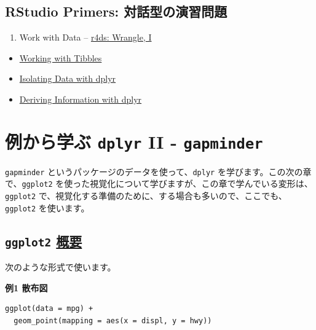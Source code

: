 \documentclass[
  xelatex, ja=standard]{bxjsbook}
\providecommand{\tightlist}{%
  \setlength{\itemsep}{0pt}\setlength{\parskip}{0pt}}
\theoremstyle{definition}
\theoremstyle{definition}
\theoremstyle{definition}
\theoremstyle{definition}
\theoremstyle{remark}
\begin{document}
\hypertarget{rstudio-primers-ux5bfeux8a71ux578bux306eux6f14ux7fd2ux554fux984c}{%
\subsection{RStudio Primers: 対話型の演習問題}\label{rstudio-primers-ux5bfeux8a71ux578bux306eux6f14ux7fd2ux554fux984c}}

\begin{enumerate}
\def\labelenumi{\arabic{enumi}.}
\setcounter{enumi}{1}
\tightlist
\item
  Work with Data -- \href{https://r4ds.had.co.nz/wrangle-intro.html\#wrangle-intro}{r4ds: Wrangle, I}
\end{enumerate}

\begin{itemize}
\tightlist
\item
  \href{https://rstudio.cloud/learn/primers/2.1}{Working with Tibbles}
\item
  \href{https://rstudio.cloud/learn/primers/2.2}{Isolating Data with dplyr}
\item
  \href{https://rstudio.cloud/learn/primers/2.3}{Deriving Information with dplyr}
\end{itemize}

\hypertarget{ux4f8bux304bux3089ux5b66ux3076-dplyr-ii---gapminder}{%
\section{\texorpdfstring{例から学ぶ \texttt{dplyr} II - \texttt{gapminder}}{例から学ぶ dplyr II - gapminder}}\label{ux4f8bux304bux3089ux5b66ux3076-dplyr-ii---gapminder}}

\texttt{gapminder} というパッケージのデータを使って、\texttt{dplyr} を学びます。この次の章で、\texttt{ggplot2} を使った視覚化について学びますが、この章で学んでいる変形は、\texttt{ggplot2} で、視覚化する準備のために、する場合も多いので、ここでも、\texttt{ggplot2} を使います。

\hypertarget{ggplot2-ux6982ux8981}{%
\subsection{\texorpdfstring{\texttt{ggplot2} \href{https://ggplot2.tidyverse.org}{概要}}{ggplot2 概要}}\label{ggplot2-ux6982ux8981}}

次のような形式で使います。

\textbf{例1 散布図}

\begin{verbatim}
ggplot(data = mpg) + 
  geom_point(mapping = aes(x = displ, y = hwy))
\end{verbatim}
\end{document}
